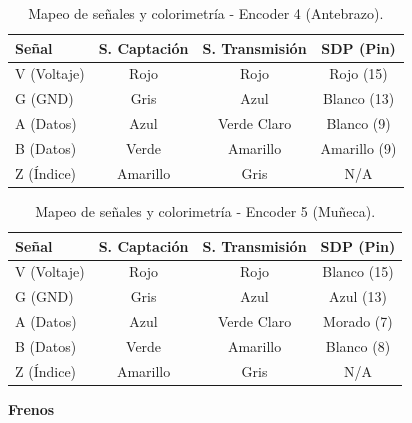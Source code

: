 	\begin{table}[h]
		\centering
		\caption{Mapeo de señales y colorimetría - Encoder 4 (Antebrazo).}
		\label{tab:encoder_antebrazo}
		\renewcommand{\arraystretch}{1.5}
		\begin{tabular}{lccc}
			\toprule
			\textbf{Señal} & \textbf{S. Captación} & \textbf{S. Transmisión} & \textbf{SDP (Pin)} \\ \midrule
			V (Voltaje)    & Rojo                  & Rojo                    & Rojo (15)          \\
			G (GND)        & Gris                  & Azul                    & Blanco (13)        \\
			A (Datos)      & Azul                  & Verde Claro             & Blanco (9)         \\
			B (Datos)      & Verde                 & Amarillo                & Amarillo (9)       \\
			Z (Índice)     & Amarillo              & Gris                    & N/A        \\ \bottomrule
		\end{tabular}
	\end{table}
	
	\begin{table}[h]
		\centering
		\caption{Mapeo de señales y colorimetría - Encoder 5 (Muñeca).}
		\label{tab:encoder_muneca}
		\renewcommand{\arraystretch}{1.5}
		\begin{tabular}{lccc}
			\toprule
			\textbf{Señal} & \textbf{S. Captación} & \textbf{S. Transmisión} & \textbf{SDP (Pin)} \\ \midrule
			V (Voltaje)    & Rojo                  & Rojo                    & Blanco (15)        \\
			G (GND)        & Gris                  & Azul                    & Azul (13)          \\
			A (Datos)      & Azul                  & Verde Claro             & Morado (7)         \\
			B (Datos)      & Verde                 & Amarillo                & Blanco (8)         \\
			Z (Índice)     & Amarillo              & Gris                    & N/A         \\ \bottomrule
		\end{tabular}
	\end{table}
	
	\clearpage
	\textbf{Frenos}
	
